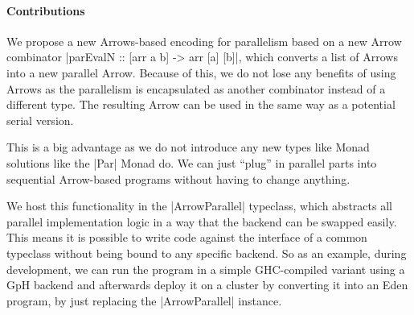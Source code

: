 \paragraph{Contributions}
%
%
We propose a new Arrows-based encoding for parallelism based on a new Arrow combinator |parEvalN :: [arr a b] -> arr [a] [b]|, which converts a list of Arrows into a new parallel Arrow. Because of this, we do not lose any benefits of using Arrows as the parallelism is encapsulated as another combinator instead of a different type. The resulting Arrow can be used in the same way as a potential serial version.

This is a big advantage as we do not introduce any new types like Monad solutions like the |Par| Monad do. We can just \enquote{plug} in parallel parts into sequential Arrow-based programs without having to change anything.

We host this functionality in the |ArrowParallel| typeclass, which abstracts all parallel implementation logic in a way that the backend can be swapped easily. This means it is possible to write code against the interface of a common typeclass without being bound to any specific backend. So as an example, during development, we can run the program in a simple GHC-compiled variant using a GpH backend and afterwards deploy it on a cluster by converting it into an Eden program, by just replacing the |ArrowParallel| instance.


